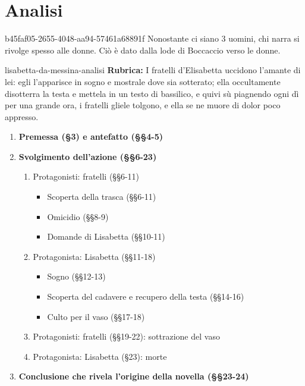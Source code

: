 \documentclass[preview]{standalone}
\begin{document}
\genpage

\section{Analisi}

\begin{snippetnote}{b45faf05-2655-4048-aa94-57461a68891f}{}
    Nonostante ci siano 3 uomini, chi narra si rivolge spesso alle donne.
    Ciò è dato dalla lode di Boccaccio verso le donne.
\end{snippetnote}

\begin{snippet}{lisabetta-da-messina-analisi}
    \textbf{Rubrica:} I fratelli d'Elisabetta uccidono
    l'amante di lei: egli l'apparisce
    in sogno e mostrale dove sia sotterato;
    ella occultamente disotterra la testa e mettela in un testo di bassilico,
    e quivi sù piagnendo ogni dì per una grande ora, i fratelli gliele tolgono,
    e ella se ne muore di dolor poco appresso.

    \begin{enumerate}
        \item \textbf{Premessa (§3) e antefatto (§§4-5)}
        \item \textbf{Svolgimento dell'azione (§§6-23)}
        \begin{enumerate}
            \item Protagonisti: fratelli (§§6-11)
            \begin{itemize}
                \item Scoperta della trasca (§§6-11)
                \item Omicidio (§§8-9)
                \item Domande di Lisabetta (§§10-11)
            \end{itemize}
            \item Protagonista: Lisabetta (§§11-18)
            \begin{itemize}
                \item Sogno (§§12-13)
                \item Scoperta del cadavere e recupero della testa (§§14-16)
                \item Culto per il vaso (§§17-18)
            \end{itemize}
            \item Protagonisti: fratelli (§§19-22): sottrazione del vaso
            \item Protagonista: Lisabetta (§23): morte
        \end{enumerate}
        \item \textbf{Conclusione che rivela l'origine della novella (§§23-24)}
    \end{enumerate}


\end{snippet}
\end{document}
